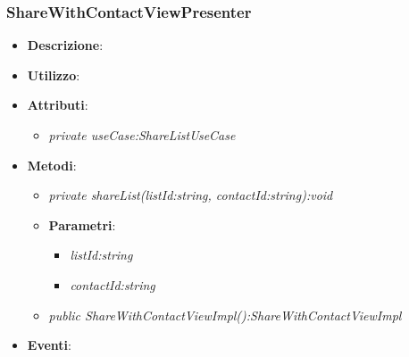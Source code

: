 \subsubsection{ShareWithContactViewPresenter}
\begin{itemize}
\item \textbf{Descrizione}: 
\item \textbf{Utilizzo}:
\item \textbf{Attributi}: 
\begin{itemize}
\item \textit{private useCase:ShareListUseCase}\\

\end{itemize}
\item \textbf{Metodi}:
\begin{itemize}
\item \textit{private shareList(listId:string, contactId:string):void}\\

	\item{\textbf{Parametri}: \begin{itemize}
	\item \textit{listId:string}\\
	
	\item \textit{contactId:string}\\
	
	\end{itemize}}
\item \textit{public ShareWithContactViewImpl():ShareWithContactViewImpl}\\

\end{itemize}
\item \textbf{Eventi}:
\end{itemize}

